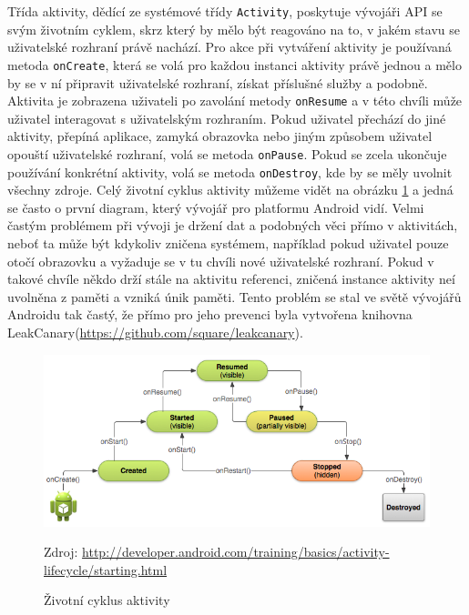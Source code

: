 \documentclass{article}
\begin{document}
 Třída aktivity, dědící ze systémové třídy \texttt{Activity},
 poskytuje vývojáři API se svým životním cyklem, skrz který by mělo být reagováno na to, v jakém
stavu se uživatelské rozhraní právě nachází. Pro akce při vytváření aktivity je používaná metoda
\texttt{onCreate}, která se volá pro každou instanci aktivity právě jednou a mělo by se v ní připravit
uživatelské rozhraní, získat příslušné služby a podobně. Aktivita je zobrazena uživateli po zavolání metody
\texttt{onResume} a v této chvíli může uživatel interagovat s uživatelským rozhraním. Pokud uživatel
přechází do jiné aktivity, přepíná aplikace, zamyká obrazovka nebo jiným způsobem uživatel opouští uživatelské
rozhraní, volá se metoda \texttt{onPause}. Pokud se zcela ukončuje používání konkrétní aktivity,
volá se metoda \texttt{onDestroy}, kde by se měly uvolnit všechny zdroje.
Celý životní cyklus aktivity můžeme vidět na obrázku \ref{fig:activitylyfecycle} a jedná se
často o první diagram, který vývojář pro platformu Android vidí.
Velmi častým problémem při vývoji je držení dat a podobných věci přímo v aktivitách,
neboť ta může být kdykoliv zničena systémem, například
pokud uživatel pouze otočí obrazovku a vyžaduje se v tu chvíli nové uživatelské rozhraní. Pokud v takové chvíle
někdo drží stále na aktivitu referenci, zničená instance aktivity neí uvolněna z paměti a vzniká únik paměti.
Tento problém se stal ve světě vývojářů Androidu tak častý, že přímo pro jeho prevenci byla vytvořena knihovna
LeakCanary(\url{https://github.com/square/leakcanary}).
\begin{figure}[H]
        \centering
                \includegraphics[scale=0.4]{img/basic-lifecycle.png}
        \caption{Životní cyklus aktivity}
        \label{fig:activitylyfecycle}
        \centering Zdroj: \url{ http://developer.android.com/training/basics/activity-lifecycle/starting.html}
\end{figure}
\end{document}
